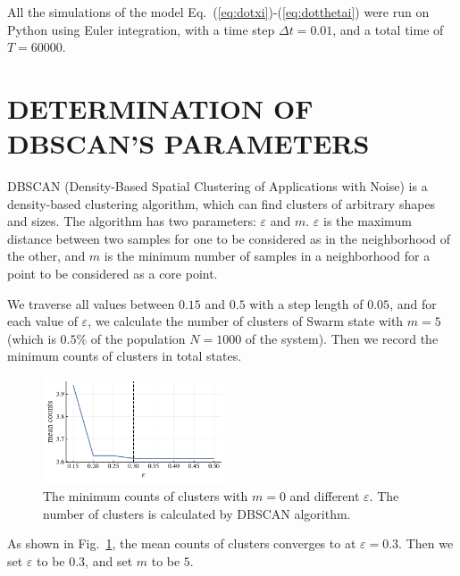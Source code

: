 \documentclass[%
 aip,
 amsmath,amssymb,
 reprint,%
]{revtex4-1}
\begin{document}
All the simulations of the model Eq.~(\ref{eq:dotxi})-(\ref{eq:dotthetai}) were run on Python using Euler integration, with a time step $\Delta t=0.01$, and a total time of $T=60000$. 


\section{\label{sec:DBSCAN_param} DETERMINATION OF DBSCAN'S PARAMETERS}

DBSCAN (Density-Based Spatial Clustering of Applications with Noise) is a density-based clustering algorithm, which can find clusters of arbitrary shapes and sizes. The algorithm has two parameters: $\varepsilon$ and $m$. $\varepsilon$ is the maximum distance between two samples for one to be considered as in the neighborhood of the other, and $m$ is the minimum number of samples in a neighborhood for a point to be considered as a core point. 

We traverse all values between $0.15$ and $0.5$ with a step length of $0.05$, and for each value of $\varepsilon$, we calculate the number of clusters of Swarm state with $m=5$ (which is $0.5\%$ of the population $N=1000$ of the system). Then we record the minimum counts of clusters in total states. 

\begin{figure}
    \includegraphics[width=0.48\textwidth]{./figs/DBSCANparam.pdf}
    \caption{
        \label{fig:DBSCANparam} The minimum counts of clusters with $m=0$ and different $\varepsilon$. The number of clusters is calculated by DBSCAN algorithm. 
    }
\end{figure}
As shown in Fig.~\ref{fig:DBSCANparam}, the mean counts of clusters converges to at $\varepsilon=0.3$. Then we set $\varepsilon$ to be $0.3$, and set $m$ to be $5$.


\end{document}

